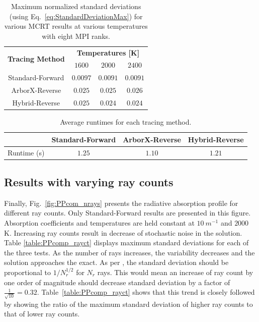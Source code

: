 \begin{table}
\centering
\caption{Maximum normalized standard deviations (using Eq.~\ref{eq:StandardDeviationMax}) for various MCRT results at various temperatures with eight MPI ranks.}
\begin{tabular}{c c c c} 
\hline
\multirow{ 2}{*}{\bfseries Tracing Method} & 
\multicolumn{3}{c}{\bfseries Temperatures [K]} \\ [0.5ex] \cline{2-4}
 & $1600$ & $2000$ & $2400$ \\ [0.5ex]
 \hline
 Standard-Forward & $0.0097$ & $0.0091$ & $0.0091$ \\ [0.5ex] 
 ArborX-Reverse & $0.025$ & $0.025$ & $0.026$ \\ [0.5ex] 
 Hybrid-Reverse & $0.025$ & $0.024$ & $0.024$ \\ [0.5ex] 
 \hline
\end{tabular}
\label{table:PPcomp_temp_mpi}
\end{table}

\begin{table}
\centering
\caption{Average runtimes for each tracing method.}
\begin{tabular}{c c c c} 
\hline
 & Standard-Forward & ArborX-Reverse & Hybrid-Reverse \\ [0.5ex]
 \hline
 Runtime (s) & $1.25$ & $1.10$ & $1.21$ \\ [0.5ex] 
 \hline
\end{tabular}
\label{table:PP_runtimes_mpi}
\end{table}



\subsection{Results with varying ray counts}
Finally, Fig.~\ref{fig:PPcom_nrays} presents the radiative absorption profile for different ray counts. Only Standard-Forward results are presented in this figure. Absorption coefficients and temperatures are held constant at $10~m^{-1}$ and $2000$ K.
Increasing ray counts result in decrease of stochastic noise in the solution. Table \ref{table:PPcomp_rayct} displays maximum standard deviations for each of the three tests. As the number of rays increases, the variability decreases and the solution approaches the exact. As per \citet{Modest2022ChapterExchange}, the standard deviation should be proportional to $1/N_r^{1/2}$ for $N_r$ rays. This would mean an increase of ray count by one order of magnitude should decrease standard deviation by a factor of $\frac{1}{\sqrt{10}} = 0.32$. Table~\ref{table:PPcomp_rayct} shows that this trend is closely followed by showing the ratio of the maximum standard deviation of higher ray counts to that of lower ray counts.


